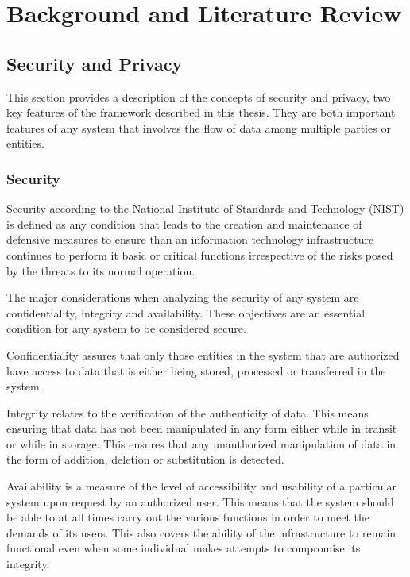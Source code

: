 \chapter{Background and Literature Review}
\label{chap:background_literature_review}

\section{Security and Privacy}

This section provides a description of the concepts of security and privacy, two key features of the framework described in this thesis. They are both important features of any system that involves the flow of data among multiple parties or entities.

\subsection{Security}\label{sec}

Security according to the National Institute of Standards and Technology (NIST) \cite{Kissel2013} is defined as any condition that leads to the creation and maintenance of defensive measures to ensure than an information technology infrastructure continues to perform it basic or critical functions irrespective of the risks posed by the threats to its normal operation.

The major considerations when analyzing the security of any system are confidentiality, integrity and availability. These objectives are an essential condition for any system to be considered secure.

Confidentiality \cite{Kissel2013} assures that only those entities in the system that are authorized have access to data that is either being stored, processed or transferred in the system.

Integrity \cite{Kissel2013} relates to the verification of the authenticity of data. This means ensuring that data has not been manipulated in any form either while in transit or while in storage. This ensures that any unauthorized manipulation of data in the form of addition, deletion or substitution is detected.

Availability \cite{Kissel2013} is a measure of the level of accessibility and usability of a particular system upon request by an authorized user. This means that the system should be able to at all times carry out the various functions in order to meet the demands of its users. This also covers the ability of the infrastructure to remain functional even when some individual makes attempts to compromise its integrity.


